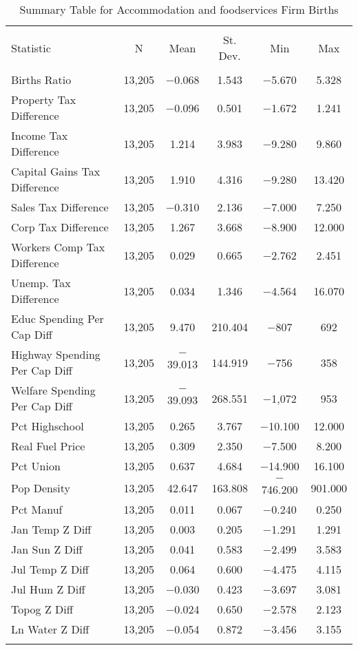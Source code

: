 
\begin{table}[!htbp] \centering 
  \caption{Summary Table for  Accommodation and foodservices Firm Births} 
  \label{72summary} 
\begin{tabular}{@{\extracolsep{5pt}}lccccc} 
\\[-1.8ex]\hline 
\hline \\[-1.8ex] 
Statistic & \multicolumn{1}{c}{N} & \multicolumn{1}{c}{Mean} & \multicolumn{1}{c}{St. Dev.} & \multicolumn{1}{c}{Min} & \multicolumn{1}{c}{Max} \\ 
\hline \\[-1.8ex] 
Births Ratio & 13,205 & $-$0.068 & 1.543 & $-$5.670 & 5.328 \\ 
Property Tax Difference & 13,205 & $-$0.096 & 0.501 & $-$1.672 & 1.241 \\ 
Income Tax Difference & 13,205 & 1.214 & 3.983 & $-$9.280 & 9.860 \\ 
Capital Gains Tax Difference & 13,205 & 1.910 & 4.316 & $-$9.280 & 13.420 \\ 
Sales Tax Difference & 13,205 & $-$0.310 & 2.136 & $-$7.000 & 7.250 \\ 
Corp Tax Difference & 13,205 & 1.267 & 3.668 & $-$8.900 & 12.000 \\ 
Workers Comp Tax Difference & 13,205 & 0.029 & 0.665 & $-$2.762 & 2.451 \\ 
Unemp. Tax Difference & 13,205 & 0.034 & 1.346 & $-$4.564 & 16.070 \\ 
Educ Spending Per Cap Diff & 13,205 & 9.470 & 210.404 & $-$807 & 692 \\ 
Highway Spending Per Cap Diff & 13,205 & $-$39.013 & 144.919 & $-$756 & 358 \\ 
Welfare Spending Per Cap Diff & 13,205 & $-$39.093 & 268.551 & $-$1,072 & 953 \\ 
Pct Highschool & 13,205 & 0.265 & 3.767 & $-$10.100 & 12.000 \\ 
Real Fuel Price & 13,205 & 0.309 & 2.350 & $-$7.500 & 8.200 \\ 
Pct Union & 13,205 & 0.637 & 4.684 & $-$14.900 & 16.100 \\ 
Pop Density & 13,205 & 42.647 & 163.808 & $-$746.200 & 901.000 \\ 
Pct Manuf & 13,205 & 0.011 & 0.067 & $-$0.240 & 0.250 \\ 
Jan Temp Z Diff & 13,205 & 0.003 & 0.205 & $-$1.291 & 1.291 \\ 
Jan Sun Z Diff & 13,205 & 0.041 & 0.583 & $-$2.499 & 3.583 \\ 
Jul Temp Z Diff & 13,205 & 0.064 & 0.600 & $-$4.475 & 4.115 \\ 
Jul Hum Z Diff & 13,205 & $-$0.030 & 0.423 & $-$3.697 & 3.081 \\ 
Topog Z Diff & 13,205 & $-$0.024 & 0.650 & $-$2.578 & 2.123 \\ 
Ln Water Z Diff & 13,205 & $-$0.054 & 0.872 & $-$3.456 & 3.155 \\ 
\hline \\[-1.8ex] 
\end{tabular} 
\end{table} 
